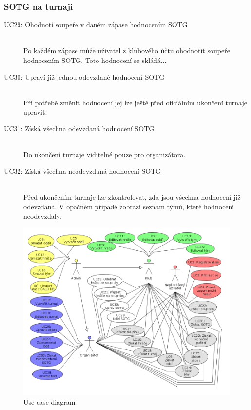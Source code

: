   \subsubsection*{SOTG na turnaji}
    \begin{description}
      \item[UC29: Ohodnotí soupeře v daném zápase hodnocením SOTG ] \hfill \\
      Po každém zápase může uživatel z klubového účtu ohodnotit soupeře hodnocením SOTG. Toto hodnocení se skládá...
      \item[UC30: Upraví již jednou odevzdané hodnocení SOTG ] \hfill \\
      Při potřebě změnit hodnocení jej lze ještě před oficiálním ukončení turnaje upravit.
      \item[UC31: Získá všechna odevzdaná hodnocení SOTG] \hfill \\
      Do ukončení turnaje viditelné pouze pro organizátora.
      \item[UC32: Získá všechna neodevzdaná hodnocení SOTG] \hfill \\
      Před ukončením turnaje lze zkontrolovat, zda jsou všechna hodnocení již odevzdaná.
      V opačném případě zobrazí seznam týmů, které hodnocení neodevzdaly.
    \end{description}
    
    
\begin{figure}[ht!]
\centering
\includegraphics[width=130mm]{./images/use-case.png}
\caption{Use case diagram\label{overflow}}
\end{figure}
    
